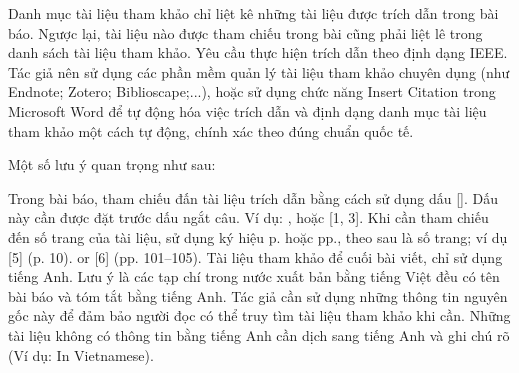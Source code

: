 Danh mục tài liệu tham khảo chỉ liệt kê những tài liệu được trích dẫn trong bài báo. Ngược lại, tài liệu nào được tham chiếu trong bài cũng phải liệt lê trong danh sách tài liệu tham khảo. Yêu cầu thực hiện trích dẫn theo định dạng IEEE. Tác giả nên sử dụng các phần mềm quản lý tài liệu tham khảo chuyên dụng (như Endnote; Zotero; Biblioscape;...), hoặc sử dụng chức năng Insert Citation trong Microsoft Word để tự động hóa việc trích dẫn và định dạng danh mục tài liệu tham khảo một cách tự động, chính xác theo đúng chuẩn quốc tế.

Một số lưu ý quan trọng như sau:

Trong bài báo, tham chiếu đấn tài liệu trích dẫn bằng cách sử dụng dấu []. Dấu này cần được đặt trước dấu ngắt câu. Ví dụ: \cite{lima_node-depth_2016}, \cite{lima_node-depth_2016, perfecto_simulation-based_2016, wu_clustered_2014} hoặc [1, 3]. Khi cần tham chiếu đến số trang của tài liệu, sử dụng ký hiệu p. hoặc pp., theo sau là số trang; ví dụ [5] (p. 10). or [6] (pp. 101–105). 
Tài liệu tham khảo để cuối bài viết, chỉ sử dụng tiếng Anh. Lưu ý là các tạp chí trong nước xuất bản bằng tiếng Việt đều có tên bài báo và tóm tắt bằng tiếng Anh. Tác giả cần sử dụng những thông tin nguyên gốc này để đảm bảo người đọc có thể truy tìm tài liệu tham khảo khi cần. Những tài liệu không có thông tin bằng tiếng Anh cần dịch sang tiếng Anh và ghi chú rõ (Ví dụ: In Vietnamese). 

